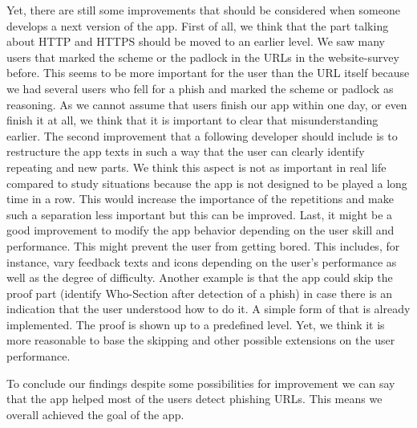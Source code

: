 Yet, there are still some improvements that should be considered when someone develops a next version of the app.
First of all, we think that the part talking about HTTP and HTTPS should be moved to an earlier level.
We saw many users that marked the scheme or the padlock in the URLs in the website-survey before.
This seems to be more important for the user than the URL itself because we had several users who fell for a phish and marked the scheme or padlock as reasoning.
As we cannot assume that users finish our app within one day, or even finish it at all, we think that it is important to clear that misunderstanding earlier.
The second improvement that a following developer should include is to restructure the app texts in such a way that the user can clearly identify repeating and new parts.
We think this aspect is not as important in real life compared to study situations because the app is not designed to be played a long time in a row.
This would increase the importance of the repetitions and make such a separation less important but this can be improved.
Last, it might be a good improvement to modify the app behavior depending on the user skill and performance.
This might prevent the user from getting bored.
This includes, for instance, vary feedback texts and icons depending on the user's performance as well as the degree of difficulty.
Another example is that the app could skip the proof part (identify Who-Section after detection of a phish) in case there is an indication that the user understood how to do it.
A simple form of that is already implemented.
The proof is shown up to a predefined level.
Yet, we think it is more reasonable to base the skipping and other possible extensions on the user performance. 

To conclude our findings despite some possibilities for improvement we can say that the app helped most of the users detect phishing URLs. This means we overall achieved the goal of the app.
